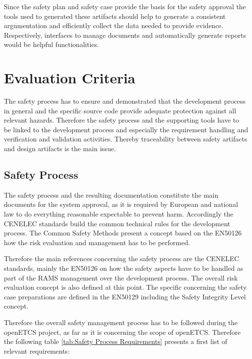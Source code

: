 \documentclass{template/openetcs_article}
\begin{document}
Since the safety plan and safety case provide the basis for the safety approval the tools used to generated these artifacts should help to generate a consistent argumentation and efficiently collect the data needed to provide evidence. Respectively, interfaces to manage documents and automatically generate reports would be helpful functionalities.

\section{Evaluation Criteria}

The safety process has to ensure and demonstrated that the development process in general and the specific source code provide adequate protection against all relevant hazards. Therefore the safety process and the supporting tools have to be linked to the development process and especially the requirement handling and verification and validation activities. Thereby traceability between safety artifacts and design artifacts is the main issue.

\subsection{Safety Process}

The safety process and the resulting documentation constitute the main documents for the system approval, as it is required by European and national law to do everything reasonable expectable to prevent harm. Accordingly the CENELEC standards build the common technical rules for the development process. The Common Safety Methods present a concept based on the EN50126 how the risk evaluation and management has to be performed. 

Therefore the main references concerning the safety process are the CENELEC standards, mainly the EN50126 on how the safety aspects have to be handled as part of the RAMS management over the development process. The overall risk evaluation concept is also defined at this point. The specific concerning the safety case preparations are defined in the EN50129 including the Safety Integrity Level concept. 

Therefore the overall safety management process has to be followed during the openETCS project, as far as it is concerning the scope of openETCS. Therefore the following table \ref{tab:Safety Process Requirements} presents a first list of relevant requirements:
\end{document}
